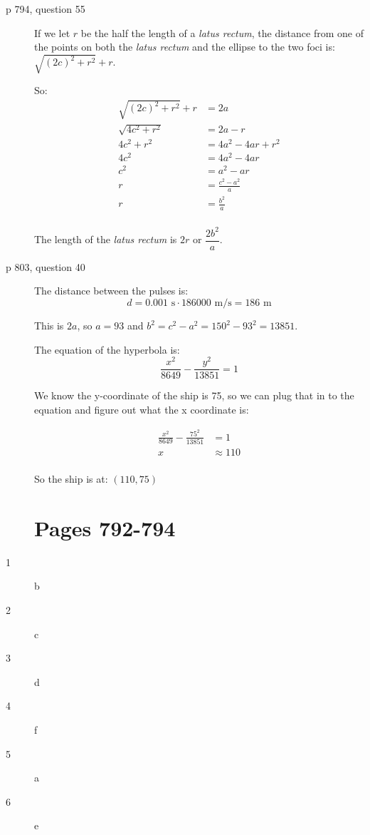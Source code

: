 \documentclass[fleqn,addpoints]{exam}
\begin{document}
\begin{description}

\item[p 794, question 55]

If we let $r$ be the half the length of a {\em latus rectum}, the distance from one of the points on both the {\em latus
  rectum} and the ellipse to the two foci is: $\sqrt{(2c)^2 + r^2} + r$.  

So:
\begin{align*}
  \sqrt{(2c)^2 + r^2} + r &= 2a \\
  \sqrt{4c^2 + r^2} &= 2a - r \\
  4c^2 + r^2 &= 4a^2 -4ar + r^2 \\
  4c^2  &= 4a^2 -4ar  \\
  c^2  &= a^2 - ar  \\
  r &= \frac{c^2 - a^2}{a} \\
  r &= \frac{b^2}{a} \\
\end{align*}

The length of the {\em latus rectum} is $2r$ or $\dfrac{2b^2}{a}$.

\item[p 803, question 40]

The distance between the pulses is:
\[
  d = 0.001 \text{ s} \cdot 186000 \text{ m/s} = 186 \text{ m}
\]

This is $2a$, so $a=93$ and $b^2 = c^2 - a^2 = 150^2 - 93^2 = 13851$.

The equation of the hyperbola is:
\[
  \frac{x^2}{8649} - \frac{y^2}{13851} = 1
\]

We know the y-coordinate of the ship is 75, so we can plug that in to the equation and figure out what the x coordinate
is: 

\begin{align*}
  \frac{x^2}{8649} - \frac{75^2}{13851} &= 1 \\
  x &\approx 110 \\
\end{align*}

So the ship is at: $(110, 75)$


\section{Pages 792-794}

\item[1] b
\item[2] c
\item[3] d
\item[4] f
\item[5] a
\item[6] e


\end{description}
\end{document}

